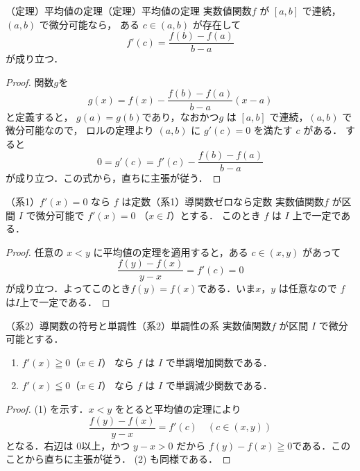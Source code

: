 \begin{example}{（定理）平均値の定理}{（定理）平均値の定理}
  実数値関数$f$ が $[a,b]$ で連続，$(a,b)$ で微分可能なら，
  ある $c \in(a,b)$ が存在して
  \[
    f'(c)=\frac{f(b)-f(a)}{b-a}
  \]
  が成り立つ．
\end{example}

\begin{tleftbar}
\begin{proof}
  関数$g$を
  \[
    g(x)=f(x)-\frac{f(b)-f(a)}{b-a}(x-a)
  \]
  と定義すると， $g(a)=g(b)$であり，なおかつ$g$ は $[a,b]$ で連続，$(a,b)$ で微分可能なので，
  ロルの定理より $(a,b)$ に $g'(c)=0$ を満たす $c$ がある．
  すると
  \[
    0=g'(c)=f'(c)-\frac{f(b)-f(a)}{b-a}
  \]
  が成り立つ．この式から，直ちに主張が従う．
\end{proof}
\end{tleftbar}

\begin{example}{（系1）$f'(x)=0$ なら $f$ は定数}{（系1）導関数ゼロなら定数}
  実数値関数$f$ が区間 $I$ で微分可能で $f'(x)=0$ （$x \in I$）とする．
  このとき $f$ は $I$ 上で一定である．
\end{example}

\begin{tleftbar}
\begin{proof}
  任意の $x<y$ に平均値の定理を適用すると，ある $c\in(x,y)$ があって
  \[
     \frac{f(y)-f(x)}{y-x}=f'(c)=0
  \]
  が成り立つ．よってこのとき$f(y)=f(x)$である．いま$x$，$y$ は任意なので $f$ は$I$上で一定である．
\end{proof}
\end{tleftbar}

\begin{example}{（系2）導関数の符号と単調性}{（系2）単調性の系}
  実数値関数$f$ が区間 $I$ で微分可能とする．
  \begin{enumerate}
    \item $f'(x)\geqq 0$（$x\in I$） なら $f$ は $I$ で単調増加関数である．
    \item $f'(x)\leqq 0$（$x\in I$） なら $f$ は $I$ で単調減少関数である．
  \end{enumerate}
\end{example}

\begin{tleftbar}
\begin{proof}
  (1) を示す．$x<y$ をとると平均値の定理により
  \[
     \frac{f(y)-f(x)}{y-x}=f'(c) \quad (c\in(x,y))
  \]
  となる．右辺は $0$以上，かつ $y-x>0$ だから $f(y)-f(x)\geqq 0$である．このことから直ちに主張が従う．
  (2) も同様である．
\end{proof}
\end{tleftbar}

